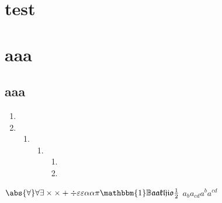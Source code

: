 \documentclass{ctexart}
\begin{document}
\chapter{test}
\chapter{aaa}
\section{aaa}
\begin{enumerate}
	\item
	\item
	      \begin{enumerate}
		      \item
		            \begin{enumerate}
			            \item
			                  \begin{enumerate}
				                  \item
				                  \item
			                  \end{enumerate}
		            \end{enumerate}
	      \end{enumerate}
\end{enumerate}
\(\abs{\forall} \forall \exists \times \times + \div \varepsilon \varepsilon \alpha \alpha \pi \mathbbm{1} \mathbb{B} \mathfrak{a} \mathfrak{a} \mathfrak{k} \mathfrak{l} \mathfrak{j} \mathfrak{i} \mathfrak{o} \frac{1}{2}\)
\(a_b a_{cd} a^b a^{cd}\)
\end{document}
